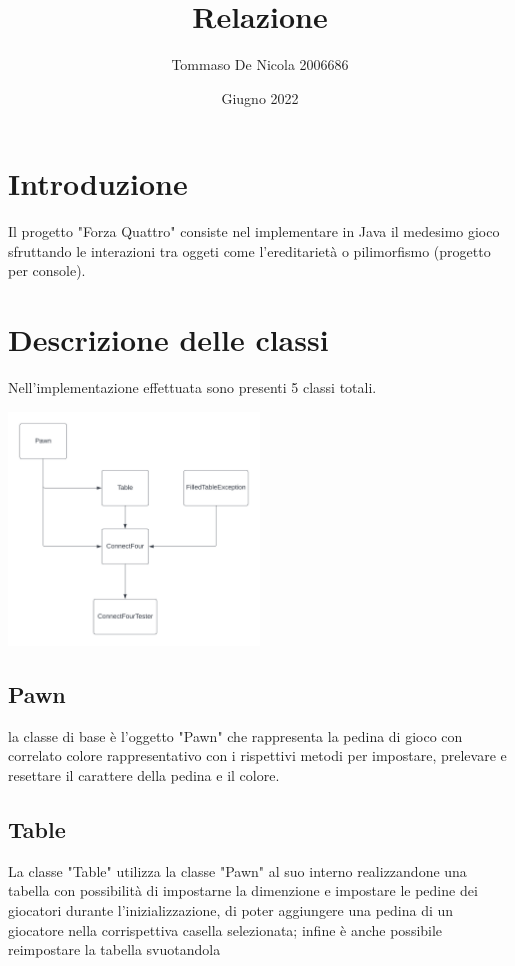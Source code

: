 \documentclass{article}
\title{Relazione}
\author{Tommaso De Nicola 2006686}
\date{Giugno 2022}
\begin{document}
\maketitle

\centering

\section{Introduzione}
Il progetto "Forza Quattro" consiste nel implementare in Java il medesimo gioco sfruttando le interazioni tra oggeti come l'ereditarietà o pilimorfismo (progetto per console).


\section{Descrizione delle classi}
Nell'implementazione effettuata sono presenti 5 classi totali.


\includegraphics[width=0.5\textwidth]{uml.png}


\subsection{Pawn}
la classe di base è l'oggetto "Pawn" che rappresenta la pedina di gioco con correlato colore rappresentativo con i rispettivi metodi per impostare, prelevare e resettare il carattere della pedina e il colore.


\subsection{Table}
La classe "Table" utilizza la classe "Pawn" al suo interno realizzandone una tabella con possibilità di impostarne la dimenzione e impostare le pedine dei giocatori durante l'inizializzazione, di poter aggiungere una pedina di un giocatore nella corrispettiva casella selezionata; infine è anche possibile reimpostare la tabella svuotandola
\end{document}
